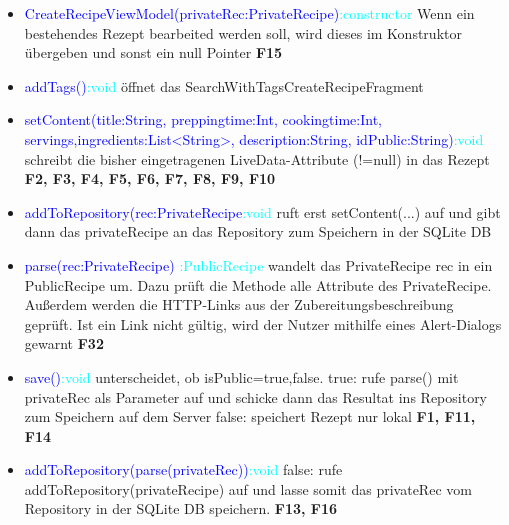 \begin{itemize}
	\item \textcolor{blue}{CreateRecipeViewModel(privateRec:PrivateRecipe)}\textcolor{cyan}{:constructor} Wenn ein bestehendes Rezept bearbeited werden soll, wird dieses im Konstruktor übergeben und sonst ein null Pointer \textbf{F15}

	\item \textcolor{blue}{addTags()}\textcolor{cyan}{:void} öffnet das  SearchWithTagsCreateRecipeFragment 
	
	\item \textcolor{blue}{setContent(title:String, preppingtime:Int, cookingtime:Int, servings,ingredients:List<String>, description:String, idPublic:String)}\textcolor{cyan}{:void} schreibt die bisher eingetragenen LiveData-Attribute (!=null) in das Rezept \textbf{F2, F3, F4, F5, F6, F7, F8, F9, F10}
	
	\item \textcolor{blue}{addToRepository(rec:PrivateRecipe}\textcolor{cyan}{:void} ruft erst setContent(...) auf und gibt dann das privateRecipe an das Repository zum Speichern in der SQLite DB
	
	\item \textcolor{blue}{parse(rec:PrivateRecipe)} \textcolor{cyan}{:PublicRecipe} wandelt das PrivateRecipe rec in ein PublicRecipe um. Dazu prüft die Methode alle Attribute des PrivateRecipe. Außerdem werden die HTTP-Links aus der Zubereitungsbeschreibung geprüft. Ist ein Link nicht gültig, wird der Nutzer mithilfe eines Alert-Dialogs gewarnt \textbf{F32}
	
	\item \textcolor{blue}{save()}\textcolor{cyan}{:void} unterscheidet, ob isPublic={true,false}.
	true: rufe parse() mit privateRec als Parameter auf 
	und schicke dann das Resultat ins Repository
	zum Speichern auf dem Server
	false: speichert Rezept nur lokal \textbf{F1, F11, F14}
	
	\item \textcolor{blue}{addToRepository(parse(privateRec))}\textcolor{cyan}{:void}
	false: rufe addToRepository(privateRecipe) auf und
	lasse somit das privateRec vom Repository in der 
	SQLite DB speichern. \textbf{F13, F16}
	
	
	
\end{itemize}


